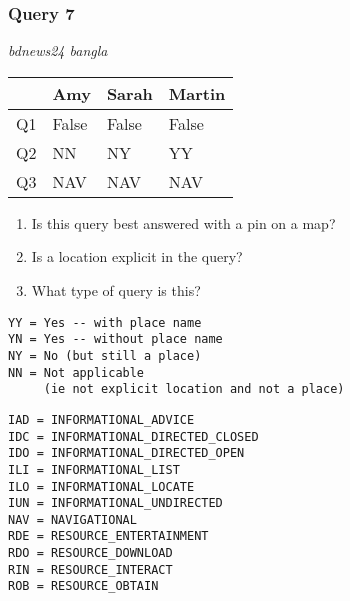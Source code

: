 \begin{frame}[fragile]
\frametitle{Query 7}
\vspace{1em}

\emph{bdnews24 bangla}

\vfill

\begin{table}
  \centering
  \begin{tabular}{ l l l l }
    & \textbf{Amy} & \textbf{Sarah} & \textbf{Martin}\\
    \toprule
    Q1 & False & False & False\\
Q2 & NN & NY & YY\\
Q3 & NAV & NAV & NAV\\
    \bottomrule
  \end{tabular}
\end{table}

\vfill

\tiny{

\begin{enumerate}
\item Is this query best answered with a pin on a map?
\item Is a location explicit in the query?
\item What type of query is this?
\end{enumerate}

\vfill

\begin{multicols}{2}
\begin{verbatim}
YY = Yes -- with place name
YN = Yes -- without place name
NY = No (but still a place)
NN = Not applicable 
     (ie not explicit location and not a place)
\end{verbatim}

\columnbreak
\begin{verbatim}
IAD = INFORMATIONAL_ADVICE
IDC = INFORMATIONAL_DIRECTED_CLOSED
IDO = INFORMATIONAL_DIRECTED_OPEN
ILI = INFORMATIONAL_LIST
ILO = INFORMATIONAL_LOCATE
IUN = INFORMATIONAL_UNDIRECTED
NAV = NAVIGATIONAL
RDE = RESOURCE_ENTERTAINMENT
RDO = RESOURCE_DOWNLOAD
RIN = RESOURCE_INTERACT
ROB = RESOURCE_OBTAIN
\end{verbatim}
\end{multicols}
}

\end{frame}


